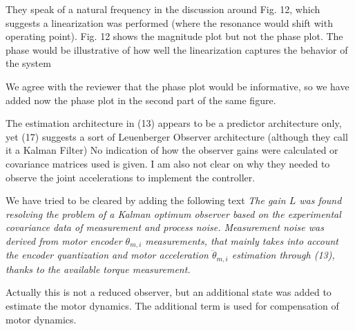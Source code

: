 \begin{point}

 They speak of a natural
frequency in the discussion around Fig. 12, which suggests a
linearization was performed (where the resonance would shift with
operating point). Fig. 12 shows the magnitude plot but not the phase
plot. The phase would be illustrative of how well the linearization
captures the behavior of the system
\end{point}
\begin{reply}
We agree with the reviewer that the phase plot would be informative, so we have added now the phase plot in the second part of the same figure.
\end{reply}



\begin{point}

 The estimation architecture in
(13) appears to be a predictor architecture only, yet (17) suggests a
sort of Leuenberger Observer architecture (although they call it a
Kalman Filter) No indication of how the observer gains were calculated
or covariance matrices used is given. I am also not clear on why they
needed to observe the joint accelerations to implement the controller.

\end{point}
\begin{reply}

 We have tried to be cleared by adding the following text
 {\em The gain $L$ was found resolving the problem of a Kalman optimum observer based on the experimental covariance data of measurement and process noise. Measurement noise was derived from motor encoder ${\theta}_{m,i}$ measurements, that mainly takes into account the encoder quantization and motor acceleration $\ddot{\theta}_{m,i}$ estimation through (13), thanks to the available torque measurement.}

Actually this is not a reduced observer, but an additional state was added to estimate the motor dynamics. The additional term is used for compensation of motor dynamics.
\end{reply}



